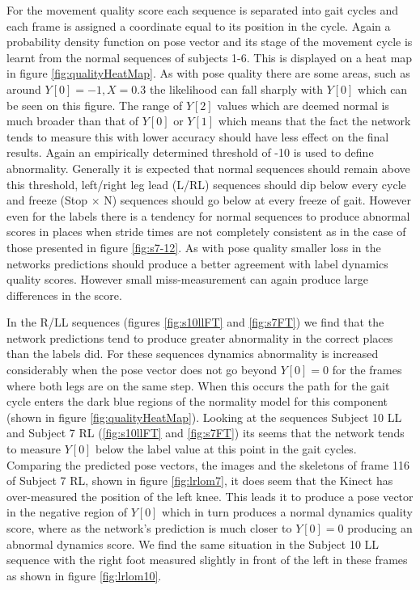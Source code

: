 \documentclass[11pt]{article} %
\begin{document}
For the movement quality score each sequence is separated into gait cycles and each frame is assigned a coordinate equal to its position in the cycle. Again a probability density function on pose vector and its stage of the movement cycle is learnt from the normal sequences of subjects 1-6. This is displayed on a heat map in figure \ref{fig:qualityHeatMap}. As with pose quality there are some areas, such as around $Y[0]=-1,X=0.3$ the likelihood can fall sharply with $Y[0]$ which can be seen on this figure. The range of $Y[2]$ values which are deemed normal is much broader than that of $Y[0]$ or $Y[1]$ which means that the fact the network tends to measure this with lower accuracy should have less effect on the final results. Again an empirically determined threshold of -10 is used to define abnormality. Generally it is expected that normal sequences should remain above this threshold, left/right leg lead (L/RL) sequences should dip below every cycle and freeze (Stop $\times$ N) sequences should go below at every freeze of gait. However even for the labels there is a tendency for normal sequences to produce abnormal scores in places when stride times are not completely consistent as in the case of those presented in figure \ref{fig:s7-12}. As with pose quality smaller loss in the networks predictions should produce a better agreement with label dynamics quality scores. However small miss-measurement can again produce large differences in the score. 

In the R/LL sequences (figures \ref{fig:s10llFT} and \ref{fig:s7FT}) we find that the network predictions tend to produce greater abnormality in the correct places than the labels did. For these sequences dynamics abnormality is increased considerably when the pose vector does not go beyond $Y[0]=0$ for the frames where both legs are on the same step. When this occurs the path for the gait cycle enters the dark blue regions of the normality model for this component (shown in figure \ref{fig:qualityHeatMap}). Looking at the sequences Subject 10 LL and Subject 7 RL (\ref{fig:s10llFT} and \ref{fig:s7FT}) its seems that the network tends to measure $Y[0]$ below the label value at this point in the gait cycles. Comparing the predicted pose vectors, the images and the skeletons of frame 116 of Subject 7 RL, shown in figure \ref{fig:lrlom7}, it does seem that the Kinect has over-measured the position of the left knee. This leads it to produce a pose vector in the negative region of $Y[0]$ which in turn produces a normal dynamics quality score, where as the network's prediction is much closer to $Y[0]=0$ producing an abnormal dynamics score. We find the same situation in the Subject 10 LL sequence with the right foot measured slightly in front of the left in these frames as shown in figure \ref{fig:lrlom10}. 
\end{document}
